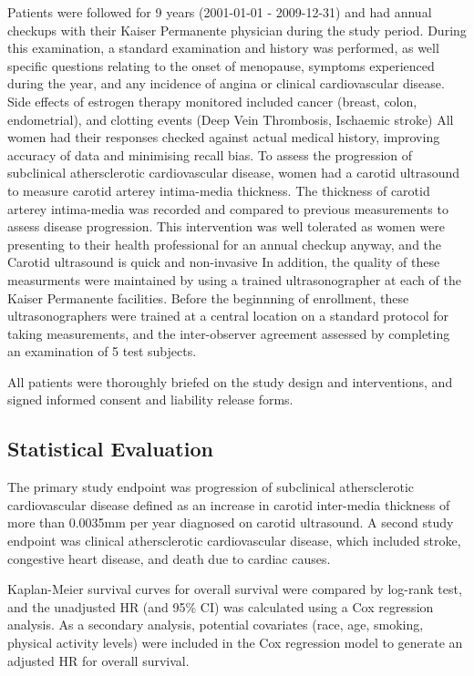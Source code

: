 \documentclass[11pt]{article}
\begin{document}
		
		Patients were followed for 9 years (2001-01-01 - 2009-12-31) and had annual checkups with their Kaiser Permanente physician during the study period.
		During this examination, a standard examination and history was performed, as well specific questions relating to the onset of menopause, symptoms experienced during the year, and any incidence of angina or clinical cardiovascular disease.
		Side effects of estrogen therapy monitored included cancer (breast, colon, endometrial), and clotting events (Deep Vein Thrombosis, Ischaemic stroke)
		All women had their responses checked against actual medical history, improving accuracy of data and minimising recall bias.
		To assess the progression of subclinical athersclerotic cardiovascular disease, women had a carotid ultrasound to measure carotid arterey intima-media thickness.
		The thickness of carotid arterey intima-media was recorded and compared to previous measurements to assess disease progression.
		This intervention was well tolerated as women were presenting to their health professional for an annual checkup anyway, and the Carotid ultrasound is quick and non-invasive
		In addition, the quality of these measurments were maintained by using a trained ultrasonographer at each of the Kaiser Permanente facilities.
		Before the beginnning of enrollment, these ultrasonographers were trained at a central location on a standard protocol for taking measurements, and the inter-observer agreement assessed by completing an examination of 5 test subjects.


		All patients were thoroughly briefed on the study design and interventions, and signed informed consent and liability release forms.


	\subsection{Statistical Evaluation}
		The primary study endpoint was progression of subclinical athersclerotic cardiovascular disease defined as an increase in carotid inter-media thickness of more than 0.0035mm per year diagnosed on carotid ultrasound.
		A second study endpoint was clinical athersclerotic cardiovascular disease, which included stroke, congestive heart disease, and death due to cardiac causes.


		Kaplan-Meier survival curves for overall survival were compared by log-rank test, and the unadjusted HR (and 95\% CI) was calculated using a Cox regression analysis.
		As a secondary analysis, potential covariates (race, age, smoking, physical activity levels) were included in the Cox regression model to generate an adjusted HR for overall survival.
\end{document}
